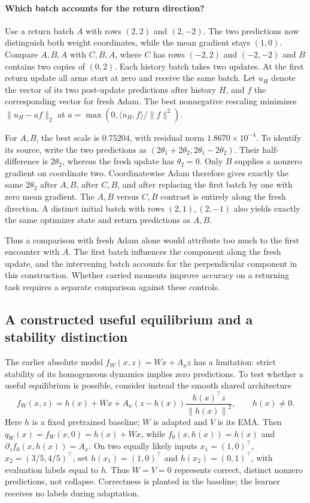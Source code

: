 \documentclass[11pt,a4paper]{article}
\newcommand{\norm}[1]{\left\lVert #1\right\rVert}
\begin{document}
\paragraph{Which batch accounts for the return direction?}
Use a return batch $A$ with rows $(2,2)$ and $(2,-2)$. The two predictions
now distinguish both weight coordinates, while the mean gradient stays
$(1,0)$. Compare $A,B,A$ with $C,B,A$, where $C$ has rows $(-2,2)$
and $(-2,-2)$ and $B$ contains two copies of $(0,2)$. Each history batch
takes two updates. At the first return update all arms start at zero and
receive the same batch. Let $u_H$ denote the vector of its two post-update
predictions after history $H$, and $f$ the corresponding vector for fresh
Adam. The best nonnegative rescaling minimizes $\|u_H-a f\|_2$ at
$a=\max(0,\langle u_H,f\rangle/\|f\|^2)$.

For $A,B$, the best scale is $0.75204$, with residual norm
$1.8670\times10^{-4}$. To identify its source, write the two predictions
as $(2\theta_1+2\theta_2,2\theta_1-2\theta_2)$. Their half-difference
is $2\theta_2$, whereas the fresh update has $\theta_2=0$. Only $B$
supplies a nonzero gradient on coordinate two. Coordinatewise Adam
therefore gives exactly the same $2\theta_2$ after $A,B$, after $C,B$,
and after replacing the first batch by one with zero mean gradient.
The $A,B$ versus $C,B$ contrast is entirely along the fresh direction.
A distinct initial batch with rows $(2,1),(2,-1)$ also yields exactly
the same optimizer state and return predictions as $A,B$.

Thus a comparison with fresh Adam alone would attribute too much to the
first encounter with $A$. The first batch influences the component along
the fresh update, and the intervening batch accounts for the perpendicular
component in this construction. Whether carried moments improve accuracy
on a returning task requires a separate comparison against these controls.

\subsection{A constructed useful equilibrium and a stability distinction}
The earlier absolute model $f_W(x,z)=Wx+A_xz$ has a limitation: strict
stability of its homogeneous dynamics implies zero predictions. To test
whether a useful equilibrium is possible, consider instead the smooth
shared architecture
\begin{equation}
 f_W(x,z)=h(x)+Wx+
 A_x(z-h(x))\frac{h(x)^\top z}{\norm{h(x)}^2},
 \qquad h(x)\ne0.
 \label{eq:realization}
\end{equation}
Here $h$ is a fixed pretrained baseline; $W$ is adapted and $V$ is its EMA.
Then $q_W(x)=f_W(x,0)=h(x)+Wx$, while $f_0(x,h(x))=h(x)$ and
$\partial_z f_0(x,h(x))=A_x$. On two equally likely inputs
$x_1=(1,0)^\top$, $x_2=(3/5,4/5)^\top$, set
$h(x_1)=(1,0)^\top$ and $h(x_2)=(0,1)^\top$, with evaluation labels
equal to $h$. Thus $W=V=0$ represents correct, distinct nonzero
predictions, not collapse. Correctness is planted in the baseline;
the learner receives no labels during adaptation.
\end{document}
